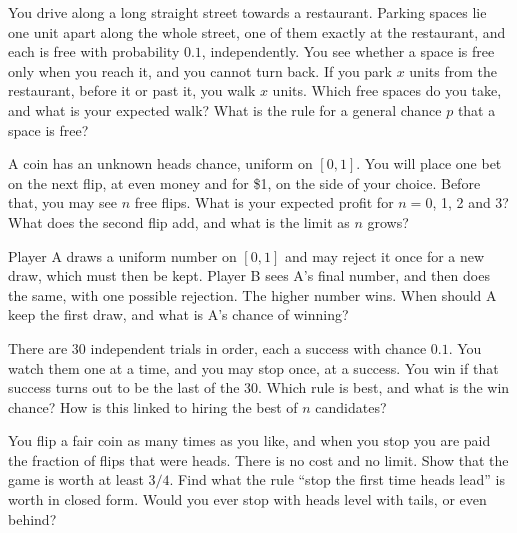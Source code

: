 \begin{question}\label{iq:iv1:optimal-stopping:15}
You drive along a long straight street towards a restaurant. Parking spaces lie one unit apart along the whole street, one of them exactly at the restaurant, and each is free with probability $0.1$, independently. You see whether a space is free only when you reach it, and you cannot turn back. If you park $x$ units from the restaurant, before it or past it, you walk $x$ units. Which free spaces do you take, and what is your expected walk? What is the rule for a general chance $p$ that a space is free?
\end{question}

\begin{question}\label{iq:iv1:optimal-stopping:16}
A coin has an unknown heads chance, uniform on $[0, 1]$. You will place one bet on the next flip, at even money and for \$1, on the side of your choice. Before that, you may see $n$ free flips. What is your expected profit for $n = 0$, 1, 2 and 3? What does the second flip add, and what is the limit as $n$ grows?
\end{question}

\begin{question}\label{iq:iv1:optimal-stopping:17}
Player A draws a uniform number on $[0, 1]$ and may reject it once for a new draw, which must then be kept. Player B sees A's final number, and then does the same, with one possible rejection. The higher number wins. When should A keep the first draw, and what is A's chance of winning?
\end{question}

\begin{question}\label{iq:iv1:optimal-stopping:18}
There are 30 independent trials in order, each a success with chance $0.1$. You watch them one at a time, and you may stop once, at a success. You win if that success turns out to be the last of the 30. Which rule is best, and what is the win chance? How is this linked to hiring the best of $n$ candidates?
\end{question}

\begin{question}\label{iq:iv1:optimal-stopping:19}
You flip a fair coin as many times as you like, and when you stop you are paid the fraction of flips that were heads. There is no cost and no limit. Show that the game is worth at least $3/4$. Find what the rule ``stop the first time heads lead'' is worth in closed form. Would you ever stop with heads level with tails, or even behind?
\end{question}

